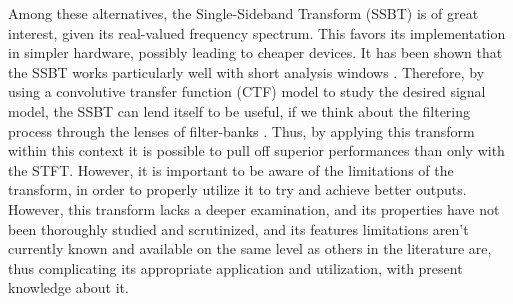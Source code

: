
Among these alternatives, the Single-Sideband Transform (SSBT) \cite{crochiere_multirate_1983,oyzerman_speech_2012} is of great interest, given its real-valued frequency spectrum. This favors its implementation in simpler hardware, possibly leading to cheaper devices. It has been shown that the SSBT works particularly well with short analysis windows \cite{crochiere_multirate_1983}. Therefore, by using a convolutive transfer function (CTF) model \cite{talmon_relative_2009} to study the desired signal model, the SSBT can lend itself to be useful, if we think about the filtering process through the lenses of filter-banks \cite{kumatani_filter_2008,gopinath_tutorial_1993}. Thus, by applying this transform within this context it is possible to pull off superior performances than only with the STFT. However, it is important to be aware of the limitations of the transform, in order to properly utilize it to try and achieve better outputs. However, this transform lacks a deeper examination, and its properties have not been thoroughly studied and scrutinized, and its features limitations aren't currently known and available on the same level as others in the literature are, thus complicating its appropriate application and utilization, with present knowledge about it.


